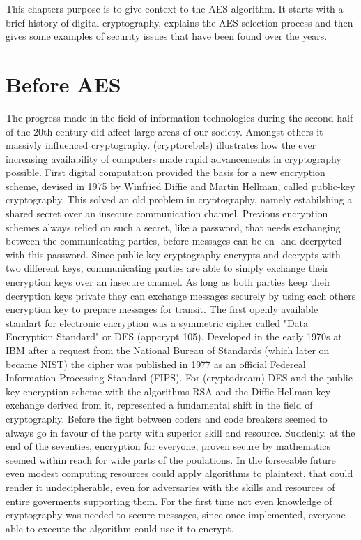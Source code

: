 This chapters purpose is to give context to the AES algorithm. It starts with a brief history of digital cryptography, explains the AES-selection-process and then gives some examples of security issues that have been found over the years.


\section{Before AES}
\label{ch:before-aes}
The progress made in the field of information technologies during the second half of the 20th century did affect large areas of our society. Amongst others it massivly influenced cryptography. (cryptorebels) illustrates how the ever increasing availability of computers made rapid advancements in cryptography possible. First digital computation provided the basis for a new encryption scheme, devised in 1975 by Winfried Diffie and Martin Hellman, called public-key cryptography. This solved an old problem in cryptography, namely estabilshing a shared secret over an insecure communication channel. Previous encryption schemes always relied on such a secret, like a password, that needs exchanging between the communicating parties, before messages can be en- and decrpyted with this password. Since public-key cryptography encrypts and decrypts with two different keys, communicating parties are able to simply exchange their encryption keys over an insecure channel. As long as both parties keep their decryption keys private they can exchange messages securely by using each others encryption key to prepare messages for transit. 
The first openly available standart for electronic encryption was a symmetric cipher called "Data Encryption Standard" or DES (appcrypt 105). Developed in the early 1970s at IBM after a request from the National Bureau of Standards (which later on became NIST) the cipher was published in 1977 as an official Federeal Information Processing Standard (FIPS). For (cryptodream) DES and the public-key encryption scheme with the algorithms RSA and the Diffie-Hellman key exchange derived from it, represented a fundamental shift in the field of cryptography. Before the fight between coders and code breakers seemed to always go in favour of the party with superior skill and resource. Suddenly, at the end of the seventies, encryption for everyone, proven secure by mathematics seemed within reach for wide parts of the poulations. In the forseeable future even modest computing resources could apply algorithms to plaintext, that could render it undecipherable, even for adversaries with the skills and resources of entire goverments supporting them. For the first time not even knowledge of cryptography was needed to secure messages, since once implemented, everyone able to execute the algorithm could use it to encrypt.
